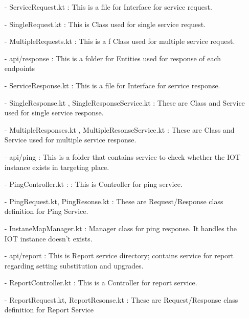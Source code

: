 \documentclass[conference]{IEEEtran}
\begin{document}
\begin{enumerate}
        \item [-] ServiceRequest.kt : This is a file for Interface for service request.\\
        \item [-]SingleRequest.kt : This is Class used for single service request.\\
        \item[-] MultipleRequests.kt  : This is a f Class used for multiple service request.\\
        \item [-] api/response : This is a folder for Entities used for response of each endpoints\\
        \item [-] ServiceResponse.kt : This is a file for Interface for service response.\\
        \item [-] SingleResponse.kt , SingleResponseService.kt  : These are Class and Service used for single service
response.\\
        \item [-]MultipleResponses.kt , MultipleResonseService.kt  : These are Class and Service used for multiple service
response.\\
        \item[-] api/ping : This is a folder that contains service to check whether the IOT instance exists in targeting
place.\\
        \item [-] PingController.kt : : This is Controller for ping service.\\
        \item [-] PingRequest.kt, PingResonse.kt : These are Request/Response class definition for Ping Service.\\
        \item [-] InstaneMapManager.kt :  Manager class for ping response. It handles the IOT instance doesn't exists.\\
        \item [-] api/report : This is Report service directory; contains service for report regarding setting substitution and
upgrades. \\
        \item [-] ReportController.kt : This is a  Controller for report service.\\
        \item [-] ReportRequest.kt, ReportResonse.kt  : These are Request/Response class definition for Report Service\\

\end{enumerate}
\end{document}
